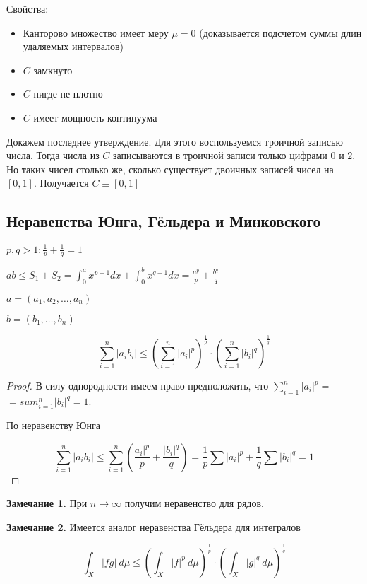 Свойства:
\begin{itemize}
  \item Канторово множество имеет меру $\mu = 0$ (доказывается подсчетом суммы длин удаляемых интервалов)
  \item $C$ замкнуто
  \item $C$ нигде не плотно
  \item $C$ имеет мощность континуума
\end{itemize}

Докажем последнее утверждение. Для этого воспользуемся троичной записью числа.
Тогда числа из $C$ записываются в троичной записи только цифрами $0$ и $2$. Но таких чисел столько же, сколько существует двоичных записей
чисел на $[0, 1]$. Получается $C \equiv [0, 1]$



\subsection{Неравенства Юнга, Гёльдера и Минковского}

$p, q > 1 : \frac{1}{p} + \frac{1}{q} = 1$

\begin{theorem}[Юнг]
  $ab \leq S_1 + S_2 = \int_{0}^{a} x^{p-1} dx + \int_0^b x^{q-1} dx = \frac{a^p}{p} + \frac{b^q}{q}$
\end{theorem}

\begin{theorem}[Гёльдер]
  $a = (a_1, a_2, \dots, a_n)$

  $b = (b_1, \dots, b_n)$

  $$\sum_{i = 1}^{n} |a_ib_i| \leq \left(\sum_{i=1}^n |a_i|^p \right)^{\frac{1}{p}} \cdot \left(\sum_{i=1}^n |b_i|^q \right)^{\frac{1}{q}}$$
\end{theorem}

\begin{proof}
  В силу однородности имеем право предположить, что $\sum_{i=1}^n |a_i|^p =$\\$= sum_{i=1}^n |b_i|^q = 1$.

  По неравенству Юнга
  
  $$\sum_{i = 1}^{n} |a_ib_i| \leq \sum_{i = 1}^n \left( \frac{a_i|^p}{p} + \frac{|b_i|^q}{q}\right) =
  \frac{1}{p}\sum |a_i|^p + \frac{1}{q} \sum |b_i|^q = 1$$
\end{proof}

\textbf{Замечание 1.} При $n \to \infty$ получим неравенство для рядов.

\textbf{Замечание 2.} Имеется аналог неравенства Гёльдера для интегралов

\begin{theorem}
  $$\int_X |fg|\ d\mu \leq \left(\int_X |f|^p\ d\mu \right)^\frac{1}{p} \cdot \left(\int_X |g|^q\ d\mu \right)^\frac{1}{q}$$
\end{theorem}
